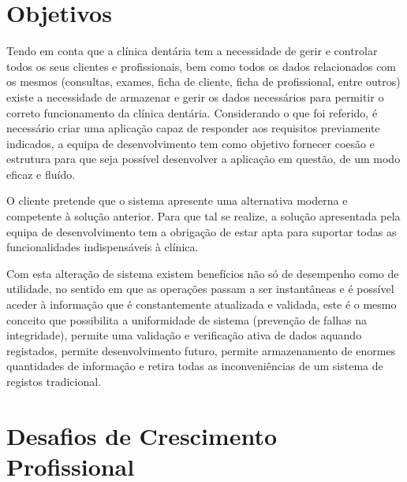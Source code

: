 \documentclass[11pt,a4paper,twoside]{report}
\begin{document}
\section{Objetivos}

Tendo em conta que a clínica dentária tem a necessidade de gerir e controlar todos os seus clientes e profissionais, bem como todos os dados relacionados com os mesmos (consultas, exames, ficha de cliente, ficha de profissional, entre outros) existe a necessidade de armazenar e gerir os dados necessários para permitir o correto funcionamento da clínica dentária.
Considerando o que foi referido, é necessário criar uma aplicação capaz de responder aos requisitos previamente indicados, a equipa de desenvolvimento tem como objetivo fornecer coesão e estrutura para que seja possível desenvolver a aplicação em questão, de um modo eficaz e fluído.

O cliente pretende que o sistema apresente uma alternativa moderna e competente à solução anterior. Para que tal se realize, a solução apresentada pela equipa de desenvolvimento tem a obrigação de estar apta para suportar todas as funcionalidades indispensáveis à clínica. 

Com esta alteração de sistema existem benefícios não só de desempenho como de utilidade, no sentido em que as operações passam a ser instantâneas e é possível aceder à informação que é constantemente atualizada e validada, este é o mesmo conceito que possibilita a uniformidade de sistema (prevenção de falhas na integridade), permite uma validação e verificação ativa de dados aquando registados, permite desenvolvimento futuro, permite armazenamento de enormes quantidades de informação e retira todas as inconveniências de um sistema de registos tradicional.


\section{Desafios de Crescimento Profissional}
\end{document}
